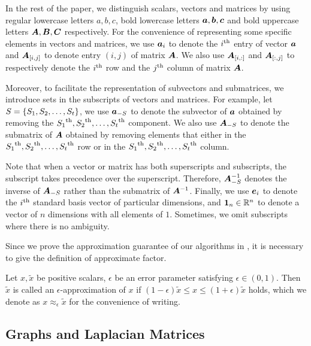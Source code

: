 \documentclass[sigconf]{acmart}
\begin{document}
In the rest of the paper, we distinguish scalars, vectors and matrices by using regular lowercase letters \(a,b,c\), bold lowercase letters \(\boldsymbol{a},\boldsymbol{b},\boldsymbol{c}\) and bold uppercase letters \(\boldsymbol{A},\boldsymbol{B},\boldsymbol{C}\) respectively.
For the convenience of representing some specific elements in vectors and matrices, we use \(\boldsymbol{a}_{i}\) to denote the \({i}^{\rm{th}}\) entry of vector \(\boldsymbol{a}\) and \(\boldsymbol{A}_{[i,j]}\) to denote entry \((i,j)\) of matrix \(\boldsymbol{A}\).
We also use \(\boldsymbol{A}_{[i,:]}\) and \(\boldsymbol{A}_{[:,j]}\) to respectively denote the \({i}^{\rm{th}}\) row and the \({j}^{\rm{th}}\) column of matrix \(\boldsymbol{A}\).

Moreover, to facilitate the representation of subvectors and submatrices, we introduce sets in the subscripts of vectors and matrices.
For example, let \(S=\left\{S_1,S_2,\dots,S_t \right\}\), we use \(\boldsymbol{a}_{-S}\) to denote the subvector of \(\boldsymbol{a}\) obtained by removing the \({S_1}^{\rm{th}},{S_2}^{\rm{th}},\dots,{S_t}^{\rm{th}}\) component.
We also use \(\boldsymbol{A}_{-S}\) to denote the submatrix of \(\boldsymbol{A}\) obtained by removing elements that either in the \({S_1}^{\rm{th}},{S_2}^{\rm{th}},\dots,{S_t}^{\rm{th}}\) row or in the \({S_1}^{\rm{th}},{S_2}^{\rm{th}},\dots,{S_t}^{\rm{th}}\) column.

Note that when a vector or matrix has both superscripts and subscripts, the subscript takes precedence over the superscript.
Therefore, \(\boldsymbol{A}_{-S}^{-1}\) denotes the inverse of \(\boldsymbol{A}_{-S}\) rather than the submatrix of \(\boldsymbol{A}^{-1}\). Finally, we use \(\boldsymbol{e}_i\) to denote the \({i}^{\rm{th}}\) standard basis vector of particular dimensions, and \(\boldsymbol{1}_n\in \mathbb{R}^n\) to denote a vector of \(n\) dimensions with all elements of \(1\). Sometimes, we omit subscripts where there is no ambiguity.

Since we prove the approximation guarantee of our algorithms in , it is necessary to give the definition of approximate factor.

\begin{definition}
    Let \(x,\tilde{x}\) be positive scalars, \(\epsilon\) be an error parameter satisfying \(\epsilon\in(0,1)\).
    Then \(\tilde{x}\) is called an \(\epsilon\)-approximation of \(x\) if \((1-\epsilon)\tilde{x}\le x\le(1+\epsilon)\tilde{x}\) holds, which we denote as \(x\approx_{\epsilon}\tilde{x}\) for the convenience of writing.
\end{definition}

\subsection{Graphs and Laplacian Matrices}\label{sub:lap}
\end{document}
